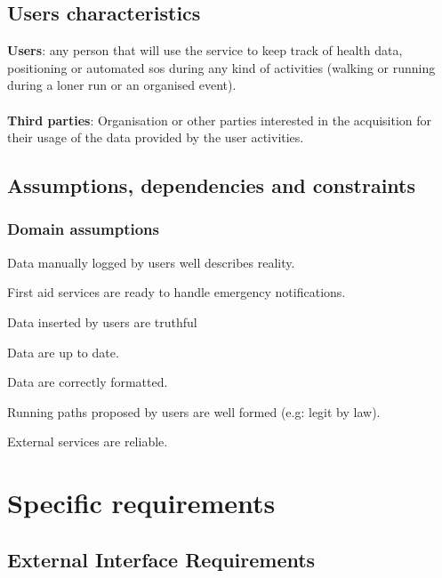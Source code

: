 \documentclass{article}
\begin{document}
\subsection{Users characteristics}
\textbf{Users}: any person that will use the service to keep track of health data, positioning or automated sos during any kind of activities (walking or running during a loner run or an organised event).\\\\
\textbf{Third parties}: Organisation or other parties interested in the acquisition for their usage of the data provided by the user activities.

\subsection{Assumptions, dependencies and constraints}

\subsubsection{Domain assumptions}

\begin{enumerate}[label={[D\arabic*]}]
    	\item Data manually logged by users well describes reality.
    	\item First aid services are ready to handle emergency notifications.
    	\item Data inserted by users are truthful 
    		\begin{enumerate}[label={[D\arabic{enumi}.\arabic*]}]
    			\item Data are up to date.
    			\item Data are correctly formatted.
  			\end{enumerate}
  		
  		\item Running paths proposed by users are well formed (e.g: legit by law).
  		\item External services are reliable.
\end{enumerate}

\section{Specific requirements}

\subsection{External Interface Requirements}
\end{document}

